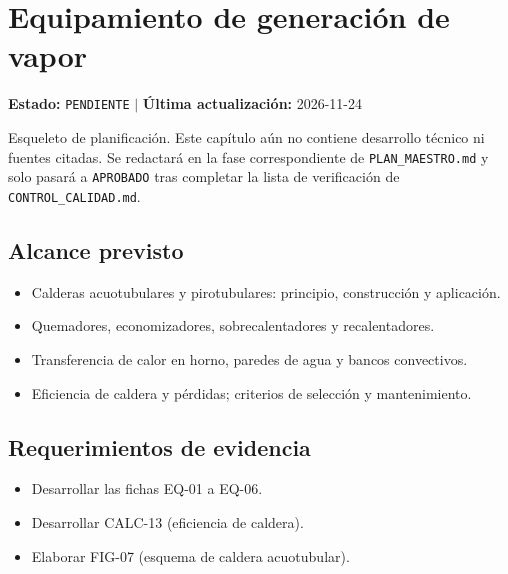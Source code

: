 \chapter{Equipamiento de generación de vapor}
\label{cap:05}

\begin{cajaestado}
\textbf{Estado:} \texttt{PENDIENTE} \quad$|$\quad
\textbf{Última actualización:} 2026-11-24

Esqueleto de planificación. Este capítulo aún no contiene desarrollo técnico ni
fuentes citadas. Se redactará en la fase correspondiente de
\texttt{PLAN\_MAESTRO.md} y solo pasará a \texttt{APROBADO} tras completar
la lista de verificación de \texttt{CONTROL\_CALIDAD.md}.
\end{cajaestado}

\section{Alcance previsto}
\begin{itemize}
  \item Calderas acuotubulares y pirotubulares: principio, construcción y aplicación.
  \item Quemadores, economizadores, sobrecalentadores y recalentadores.
  \item Transferencia de calor en horno, paredes de agua y bancos convectivos.
  \item Eficiencia de caldera y pérdidas; criterios de selección y mantenimiento.
\end{itemize}

\section{Requerimientos de evidencia}
\begin{itemize}
  \item Desarrollar las fichas EQ-01 a EQ-06.
  \item Desarrollar CALC-13 (eficiencia de caldera).
  \item Elaborar FIG-07 (esquema de caldera acuotubular).
\end{itemize}
